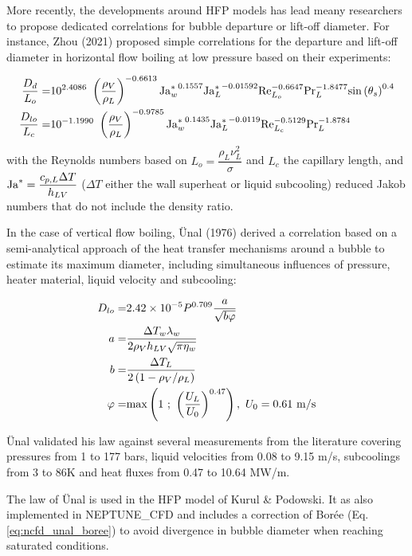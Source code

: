 \npar
More recently, the developments around HFP models has lead meany researchers to propose dedicated correlations for bubble departure or lift-off diameter. For instance, Zhou \etal (2021) \cite{zhou_mechanistic_2021} proposed simple correlations for the departure and lift-off diameter in horizontal flow boiling at low pressure based on their experiments:

\begin{align}
\frac{D_{d}}{L_{o}} =& 10^{2.4086}\ \parth{\frac{\rho_{V}}{\rho_{L}}}^{-0.6613} {\Ja^{*}_{w}}^{0.1557} {\Ja^{*}_{L}}^{-0.01592} \Re_{L_{o}}^{-0.6647} \Pr_{L}^{-1.8477} \sin{\theta_{s}}^{0.4}
\label{eq:dd_zhou}
\\
%
\frac{D_{lo}}{L_{c}} =& 10^{-1.1990}\ \parth{\frac{\rho_{V}}{\rho_{L}}}^{-0.9785} {\Ja^{*}_{w}}^{0.1435} {\Ja^{*}_{L}}^{-0.0119} \Re_{L_{c}}^{-0.5129} \Pr_{L}^{-1.8784}
\label{eq:dlo_zhou}
\end{align}
with the Reynolds numbers based on $L_{o} = \dfrac{\rho_{L}\nu_{L}^{2}}{\sigma}$ and $L_{c}$ the capillary length, and $\mathrm{Ja}^{*} = \dfrac{c_{p,L}\Delta T}{h_{LV}}$ ($\Delta T$ either the wall superheat or liquid subcooling) reduced Jakob numbers that do not include the density ratio. 


\npar


In the case of vertical flow boiling, \"Unal (1976)\cite{unal_maximum_1976} derived a correlation based on a semi-analytical approach of the heat transfer mechanisms around a bubble to estimate its maximum diameter, including simultaneous influences of pressure, heater material, liquid velocity and subcooling:

\begin{align}
D_{lo}=& 2.42\times 10^{-5} P^{0.709}\frac{a}{\sqrt{b\varphi}}
\label{eq:dlo_unal}
\\
\nonumber a =& \frac{\Delta T_{w}\lambda_{w}}{2\rho_{V}h_{LV}\sqrt{\pi \eta_{w}} }\\
\nonumber b =& \frac{\Delta T_{L}}{2\left( 1-\rho_{V}/\rho_{L} \right)}\\
\nonumber \varphi=& \mathrm{max}\left( 1\ ;\ \left( \frac{U_{L}}{U_{0}} \right)^{0.47} \right),\ U_{0}=0.61~\mathrm{m/s}
\end{align}

\"Unal validated his law against several measurements from the literature covering pressures from 1 to 177 bars, liquid velocities from 0.08 to 9.15 m/s, subcoolings from 3 to 86K and heat fluxes from 0.47 to 10.64 MW/m.


\begin{note*}{}
The law of \"Unal is used in the HFP model of Kurul \& Podowski. It as also implemented in NEPTUNE\_CFD and includes a correction of Borée \etal (Eq. \ref{eq:ncfd_unal_boree}) to avoid divergence in bubble diameter when reaching saturated conditions.
\end{note*}


